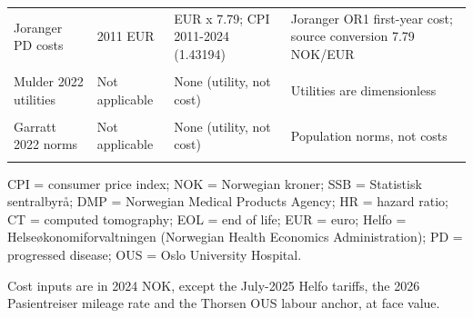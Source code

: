 \begin{table}
{\begin{threeparttable}
\begin{tabular}[t]{>{\raggedright\arraybackslash}p{4.3cm}>{\raggedright\arraybackslash}p{2.6cm}>{\raggedright\arraybackslash}p{3.6cm}>{\raggedright\arraybackslash}p{9.5cm}}
\textcolor[HTML]{2D3748}{Joranger PD costs} & \textcolor[HTML]{2D3748}{2011 EUR} & \textcolor[HTML]{2D3748}{EUR x 7.79; CPI 2011-2024 (1.43194)} & \textcolor[HTML]{2D3748}{Joranger OR1 first-year cost; source conversion 7.79 NOK/EUR}\\
\cellcolor[HTML]{F7F9FC}{\textcolor[HTML]{2D3748}{Bjørnelv 2020 EOL cost}} & \cellcolor[HTML]{F7F9FC}{\textcolor[HTML]{2D3748}{2013 NOK}} & \cellcolor[HTML]{F7F9FC}{\textcolor[HTML]{2D3748}{CPI 2013-2024 (1.39312)}} & \cellcolor[HTML]{F7F9FC}{\textcolor[HTML]{2D3748}{Kenseth 2024 states all costs were indexed to 2021, but its Table 1 last-month-of-life value equals Bjørnelv's 2013 NOK figure exactly; the 2013 basis is therefore used}}\\
\textcolor[HTML]{2D3748}{Mulder 2022 utilities} & \textcolor[HTML]{2D3748}{Not applicable} & \textcolor[HTML]{2D3748}{None (utility, not cost)} & \textcolor[HTML]{2D3748}{Utilities are dimensionless}\\
\cellcolor[HTML]{F7F9FC}{\textcolor[HTML]{2D3748}{Färkkilä 2014 utilities}} & \cellcolor[HTML]{F7F9FC}{\textcolor[HTML]{2D3748}{Not applicable}} & \cellcolor[HTML]{F7F9FC}{\textcolor[HTML]{2D3748}{None (utility, not cost)}} & \cellcolor[HTML]{F7F9FC}{\textcolor[HTML]{2D3748}{Utilities are dimensionless}}\\
\textcolor[HTML]{2D3748}{Garratt 2022 norms} & \textcolor[HTML]{2D3748}{Not applicable} & \textcolor[HTML]{2D3748}{None (utility, not cost)} & \textcolor[HTML]{2D3748}{Population norms, not costs}\\
\cellcolor[HTML]{F7F9FC}{\textcolor[HTML]{2D3748}{Courneya 2025 HRs}} & \cellcolor[HTML]{F7F9FC}{\textcolor[HTML]{2D3748}{Not applicable}} & \cellcolor[HTML]{F7F9FC}{\textcolor[HTML]{2D3748}{None (clinical, not cost)}} & \cellcolor[HTML]{F7F9FC}{\textcolor[HTML]{2D3748}{Hazard ratios are dimensionless}}\\
\bottomrule
\end{tabular}
\begin{tablenotes}
\item CPI = consumer price index; NOK = Norwegian kroner; SSB = Statistisk sentralbyrå; DMP = Norwegian Medical Products Agency; HR = hazard ratio; CT = computed tomography; EOL = end of life; EUR = euro; Helfo = Helseøkonomiforvaltningen (Norwegian Health Economics Administration); PD = progressed disease; OUS = Oslo University Hospital.
\item Cost inputs are in 2024 NOK, except the July-2025 Helfo tariffs, the 2026 Pasientreiser mileage rate and the Thorsen OUS labour anchor, at face value.

\end{tablenotes}
\end{threeparttable}}
\end{table}
